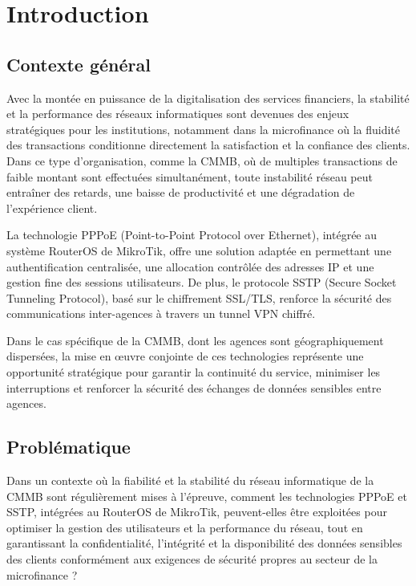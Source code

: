 \chapter*{Introduction}

\section*{Contexte général}

Avec la montée en puissance de la digitalisation des services financiers, la 
stabilité et la performance des réseaux informatiques sont devenues des enjeux 
stratégiques pour les institutions, notamment dans la microfinance où la fluidité des 
transactions conditionne directement la satisfaction et la confiance des clients. Dans ce 
type d’organisation, comme la \gls{CMMB}, où de multiples transactions de faible montant 
sont effectuées simultanément, toute instabilité réseau peut entraîner des retards, une 
baisse de productivité et une dégradation de l’expérience client. 

La technologie \gls{PPPoE} (Point-to-Point Protocol over Ethernet), intégrée au 
système \gls{RouterOS} de MikroTik, offre une solution adaptée en permettant une 
authentification centralisée, une allocation contrôlée des adresses \gls{IP} et une gestion 
fine des sessions utilisateurs. De plus, le protocole \gls{SSTP} (Secure Socket Tunneling 
Protocol), basé sur le chiffrement \gls{SSL}/\gls{TLS}, renforce la sécurité des 
communications inter-agences à travers un tunnel VPN chiffré. 

Dans le cas spécifique de la \gls{CMMB}, dont les agences sont géographiquement 
dispersées, la mise en œuvre conjointe de ces technologies représente une opportunité 
stratégique pour garantir la continuité du service, minimiser les interruptions et 
renforcer la sécurité des échanges de données sensibles entre agences. 

\section*{Problématique}

Dans un contexte où la fiabilité et la stabilité du réseau informatique de la \gls{CMMB} 
sont régulièrement mises à l’épreuve, comment les technologies PPPoE et \gls{SSTP}, 
intégrées au \gls{RouterOS} de MikroTik, peuvent-elles être exploitées pour optimiser la 
gestion des utilisateurs et la performance du réseau, tout en garantissant la 
confidentialité, l’intégrité et la disponibilité des données sensibles des clients 
conformément aux exigences de sécurité propres au secteur de la microfinance ?

